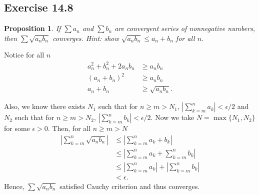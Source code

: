 \documentclass{article}
\newtheorem{proposition}[thm]{Proposition}
\begin{document}
\subsection*{Exercise 14.8}
\begin{proposition}
    If $\sum a_n$ and $\sum b_n$ are convergent series of nonnegative numbers, then 
    $\sum\sqrt{a_nb_n}$ converges. Hint: show $\sqrt{a_nb_n}\le a_n+b_n$ for all $n$.
\end{proposition}
Notice for all $n$
    \begin{align*}
        a_n^2 + b_n^2 + 2a_nb_n & \ge a_nb_n\\
        \left(a_n+b_n\right)^2 & \ge a_nb_n \\
        a_n + b_n & \ge \sqrt{a_nb_n}.
    \end{align*}

    Also, we know there exists $N_1$ such that for $n\ge m>N_1$, 
    $\left|\sum_{k=m}^na_k\right|<\epsilon/2$ and $N_2$ such that for $n\ge m>N_2$, 
    $\left|\sum_{k=m}^nb_k\right|<\epsilon/2$. Now we take $N = \max\{N_1,N_2\}$ for some 
    $\epsilon>0$. Then, for all $n\ge m>N$
    \begin{align*}
        \left|\sum_{k=m}^n\sqrt{a_nb_n}\right| & \le \left|\sum_{k=m}^{n}a_k+b_k\right| \\
        & \le \left|\sum_{k=m}^{n}a_k+\sum_{k=m}^{n}b_k\right| \\
        & \le \left|\sum_{k=m}^{n}a_k\right| + \left|\sum_{k=m}^{n}b_k\right| \\
        & < \epsilon.
    \end{align*}
    Hence, $\sum\sqrt{a_nb_n}$ satisfied Cauchy criterion and thus converges.
\end{document}
